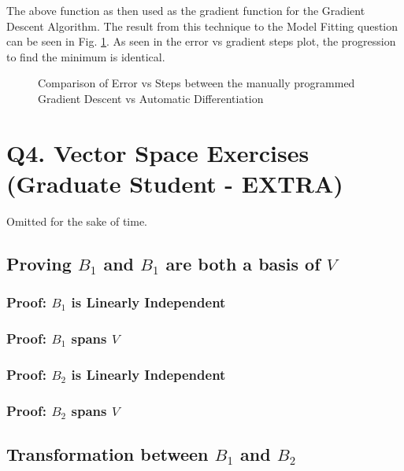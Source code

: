 \documentclass{article}
\begin{document}
    The above function as then used as the gradient function for the Gradient Descent Algorithm. The result from this technique to the Model Fitting question can be seen in Fig. \ref{fig:Q3_AutoDiff}. As seen in the error vs gradient steps plot, the progression to find the minimum is identical.

    \begin{figure}[H]
        \centering
        
        \caption{Comparison of Error vs Steps between the manually programmed Gradient Descent vs Automatic Differentiation}
        \label{fig:Q3_AutoDiff}
    \end{figure}

    \section{Q4. Vector Space Exercises (Graduate Student - EXTRA)}

    Omitted for the sake of time. 

    \subsection{Proving $B_1$ and $B_1$ are both a basis of $V$}

    \subsubsection{Proof: $B_1$ is Linearly Independent}

    \subsubsection{Proof: $B_1$ spans $V$}

    \subsubsection{Proof: $B_2$ is Linearly Independent}

    \subsubsection{Proof: $B_2$ spans $V$}

    \subsection{Transformation between $B_1$ and $B_2$}
\end{document}
